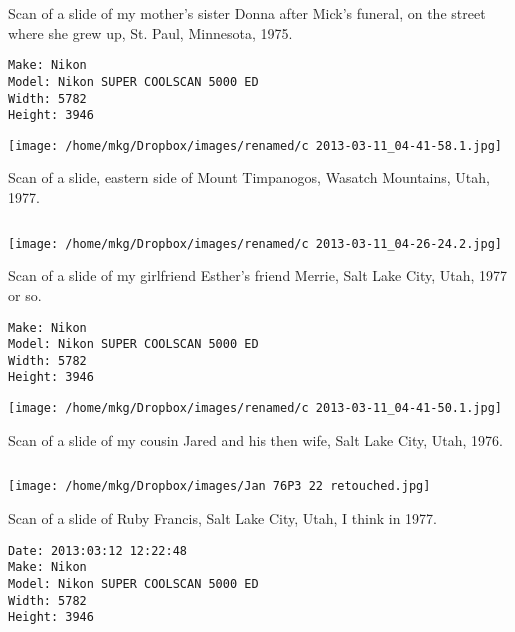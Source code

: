 \noindent Scan of a slide of my mother's sister Donna after Mick's funeral, on the street where she grew up, St. Paul, Minnesota, 1975.

\begin{lstlisting}
Make: Nikon
Model: Nikon SUPER COOLSCAN 5000 ED
Width: 5782
Height: 3946

\end{lstlisting}

\clearpage
\texttt{[image: /home/mkg/Dropbox/images/renamed/c 2013-03-11\_04-41-58.1.jpg]}

\clearpage

\noindent Scan of a slide, eastern side of Mount Timpanogos, Wasatch Mountains, Utah, 1977.

\begin{lstlisting}

\end{lstlisting}

\clearpage
\texttt{[image: /home/mkg/Dropbox/images/renamed/c 2013-03-11\_04-26-24.2.jpg]}

\clearpage

\noindent Scan of a slide of my girlfriend Esther's friend Merrie, Salt Lake City, Utah, 1977 or so.

\begin{lstlisting}
Make: Nikon
Model: Nikon SUPER COOLSCAN 5000 ED
Width: 5782
Height: 3946

\end{lstlisting}

\clearpage
\texttt{[image: /home/mkg/Dropbox/images/renamed/c 2013-03-11\_04-41-50.1.jpg]}

\clearpage

\noindent Scan of a slide of my cousin Jared and his then wife, Salt Lake City, Utah, 1976.

\begin{lstlisting}

\end{lstlisting}

\clearpage
\texttt{[image: /home/mkg/Dropbox/images/Jan 76P3 22 retouched.jpg]}

\clearpage

\noindent Scan of a slide of Ruby Francis, Salt Lake City, Utah, I think in 1977.

\begin{lstlisting}
Date: 2013:03:12 12:22:48
Make: Nikon
Model: Nikon SUPER COOLSCAN 5000 ED
Width: 5782
Height: 3946

\end{lstlisting}

